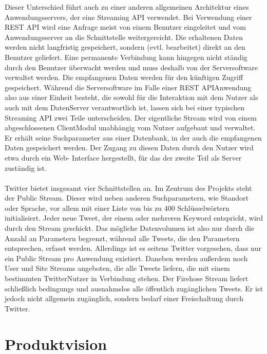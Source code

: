 Dieser Unterschied führt auch zu einer anderen allgemeinen Architektur eines
Anwendungsservers, der eine Streaming API verwendet. Bei Verwendung einer REST API wird
eine Anfrage meist von einem Benutzer eingeleitet und vom Anwendungsserver an die
Schnittstelle weitergereicht. Die erhaltenen Daten werden nicht langfristig gespeichert,
sondern (evtl. bearbeitet) direkt an den Benutzer geliefert. Eine permanente Verbindung kann 
hingegen nicht ständig durch den Benutzer überwacht werden und muss deshalb von der 
Serversoftware verwaltet werden. Die empfangenen Daten werden für den künftigen Zugriff 
gespeichert. Während die Serversoftware im Falle einer REST API­Anwendung also aus einer Einheit 
besteht, die sowohl für die Interaktion mit dem Nutzer als auch mit dem Daten­Server verantwortlich
ist, lassen sich bei einer typischen Streaming API zwei Teile unterscheiden. Der eigentliche
Stream wird von einem abgeschlossenen Client­Modul unabhängig vom Nutzer aufgebaut und verwaltet. Er 
erhält seine Suchparameter aus einer Datenbank, in der auch die empfangenen Daten
gespeichert werden. Der Zugang zu diesen Daten durch den Nutzer wird etwa durch ein Web-
Interface hergestellt, für das der zweite Teil als Server zuständig ist. 
\\\\
 Twitter bietet insgesamt vier Schnittstellen an. Im 
Zentrum des Projekts steht der Public Stream. Dieser wird neben anderen
Suchparametern, wie Standort oder Sprache, vor allem mit einer Liste von bis zu 400
Schlüsselwörtern initialisiert. Jeder neue Tweet, der einem oder mehreren Keyword entspricht,
wird durch den Stream geschickt. Das mögliche Datenvolumen ist also nur durch die Anzahl an
Parametern begrenzt, während alle Tweets, die den Parametern entsprechen, erfasst werden.
Allerdings ist es seitens Twitter vorgesehen, dass nur ein Public Stream pro Anwendung
existiert. Daneben werden außerdem noch User und Site Streams angeboten, die alle Tweets 
liefern, die mit einem bestimmten Twitter­Nutzer in Verbindung stehen. Der Firehose Stream
liefert schließlich bedingungs­ und ausnahmslos alle öffentlich zugänglichen Tweets. Er ist jedoch 
nicht allgemein zugänglich, sondern bedarf einer Freischaltung durch Twitter.

\section{Produktvision}

